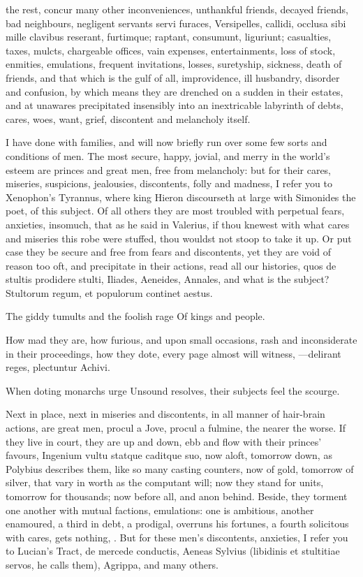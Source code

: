 {the rest, concur many other inconveniences, unthankful friends, decayed
friends, bad neighbours, negligent servants servi furaces,
Versipelles, callidi, occlusa sibi mille clavibus reserant, furtimque;
raptant, consumunt, liguriunt; casualties, taxes, mulcts, chargeable
offices, vain expenses, entertainments, loss of stock, enmities,
emulations, frequent invitations, losses, suretyship, sickness, death
of friends, and that which is the gulf of all, improvidence, ill
husbandry, disorder and confusion, by which means they are drenched on
a sudden in their estates, and at unawares precipitated insensibly into
an inextricable labyrinth of debts, cares, woes, want, grief,
discontent and melancholy itself.

I have done with families, and will now briefly run over some few sorts
and conditions of men. The most secure, happy, jovial, and merry in the
world's esteem are princes and great men, free from melancholy: but for
their cares, miseries, suspicions, jealousies, discontents, folly and
madness, I refer you to Xenophon's Tyrannus, where king Hieron
discourseth at large with Simonides the poet, of this subject. Of all
others they are most troubled with perpetual fears, anxieties,
insomuch, that as he said in Valerius, if thou knewest with what
cares and miseries this robe were stuffed, thou wouldst not stoop to
take it up. Or put case they be secure and free from fears and
discontents, yet they are void of reason too oft, and precipitate
in their actions, read all our histories, quos de stultis prodidere
stulti, Iliades, Aeneides, Annales, and what is the subject?
Stultorum regum, et populorum continet aestus.

The giddy tumults and the foolish rage
Of kings and people.

How mad they are, how furious, and upon small occasions, rash and
inconsiderate in their proceedings, how they dote, every page almost
will witness,
---delirant reges, plectuntur Achivi.

When doting monarchs urge
Unsound resolves, their subjects feel the scourge.

Next in place, next in miseries and discontents, in all manner of
hair-brain actions, are great men, procul a Jove, procul a fulmine, the
nearer the worse. If they live in court, they are up and down, ebb and
flow with their princes' favours, Ingenium vultu statque caditque suo,
now aloft, tomorrow down, as Polybius describes them, like so many
casting counters, now of gold, tomorrow of silver, that vary in worth
as the computant will; now they stand for units, tomorrow for
thousands; now before all, and anon behind. Beside, they torment one
another with mutual factions, emulations: one is ambitious, another
enamoured, a third in debt, a prodigal, overruns his fortunes, a fourth
solicitous with cares, gets nothing, \etc{}. But for these men's
discontents, anxieties, I refer you to Lucian's Tract, de mercede
conductis, Aeneas Sylvius (libidinis et stultitiae servos, he
calls them), Agrippa, and many others.

}
